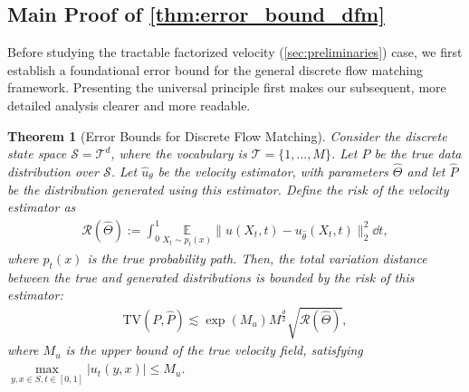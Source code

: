 \documentclass[12pt]{article}
\numberwithin{equation}{section}
\let\hat\widehat
\newcommand{\wh}{\widehat}
\renewcommand{\hat}{\wh}
\DeclareMathOperator*{\E}{{\mathbb{E}}}
\def\E{\mathbb{E}}
\theoremstyle{theoremstyle}
\newtheorem{theorem}{Theorem}[section]
\numberwithin{equation}{section}
\numberwithin{theorem}{section}
\numberwithin{proposition}{section}
\numberwithin{definition}{section}
\numberwithin{lemma}{section}
\numberwithin{assumption}{section}
\numberwithin{remark}{section}
\begin{document}
\subsection{Main Proof of \texorpdfstring{\cref{thm:error_bound_dfm}}
{Theorem \ref{thm:error_bound_dfm}}}
\label{sec:main_proof_dfm_error_bound}

Before studying the tractable factorized velocity (\cref{sec:preliminaries}) case, we first establish a foundational error bound for the general discrete flow matching framework.
Presenting the universal principle first makes our subsequent, more detailed analysis clearer and more readable.
\begin{theorem}
[Error Bounds for Discrete Flow Matching]
\label{thm:dfm_error_bound_general}
Consider the discrete state space $\mathcal{S} = \mathcal{T}^d$, where the vocabulary is $\mathcal{T} = \{1, \ldots, M\}$. 
Let $P$ be the true data distribution over $\mathcal{S}$. 
Let $\hat{u}_\theta$ be the velocity estimator, with parameters $\hat{\Theta}$ and let $\hat{P}$ be the distribution generated using this estimator.
Define the risk of the velocity estimator as 
\begin{align*}
    \mathcal{R}(\hat{\Theta}) := \int_0^1 \underset{X_t\sim p_t(x)}{\E}\|u(X_t,t)-u_{\hat{\theta}}(X_t,t)\|_2^2 \dd t,
\end{align*}
where $p_t(x)$ is the true probability path. Then, the total variation distance between the true and generated distributions is bounded by the risk of this estimator:
\begin{align*}
    \text{TV}(P,\hat{P})
    \lesssim 
    \exp(M_u) M^{\frac{d}{2}}
    \sqrt{\mathcal{R}(\hat{\Theta})},
\end{align*}
where $M_u$ is the upper bound of the true velocity field, satisfying $\underset{y,x \in S, t \in [0,1]}{\max} |u_t(y,x)| \leq M_u$.
\end{theorem}
\end{document}
